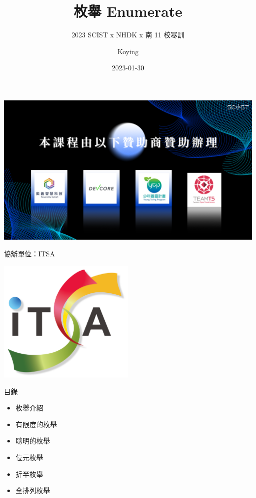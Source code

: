 \documentclass[aspectratio=169]{beamer}
\title{枚舉 Enumerate}
\subtitle{2023 SCIST x NHDK x 南 11 校寒訓}
\author{Koying}
\date{2023-01-30}
\begin{document}
    \begin{frame}
        \titlepage
    \end{frame}
    
    \begin{frame}
        \includegraphics[width=\textwidth]{./img/SCIST_Sponser.png}
    \end{frame}

    \begin{frame}{協辦單位：ITSA}
        \begin{center}
            \includegraphics[width=0.5\textwidth]{./img/ITSA.png}
        \end{center}
    \end{frame}


    \begin{frame}{目錄}
        \begin{itemize}
            \item 枚舉介紹
            \item 有限度的枚舉
            \item 聰明的枚舉
            \item 位元枚舉
            \item 折半枚舉
            \item 全排列枚舉
        \end{itemize}
    \end{frame}
\end{document}
